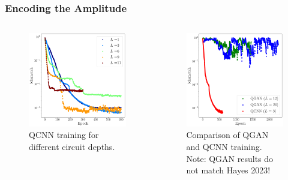 \documentclass{beamer}
\begin{document}
\begin{frame}
\frametitle{Encoding the Amplitude}
\begin{columns}
\begin{column}{0.5\textwidth}
\begin{figure}[h]
\centering
\includegraphics[width=\textwidth]{im/A_L_comp}
\caption{QCNN training for different circuit depths.}
\end{figure}
\end{column}
\begin{column}{0.5\textwidth}  
\begin{figure}[h]
\centering
\includegraphics[width=\textwidth]{im/QGAN_comp}
\caption{Comparison of QGAN and QCNN training. Note: QGAN results do not match Hayes 2023!}
\end{figure}
\end{column}
\end{columns}
\end{frame}
\end{document}

